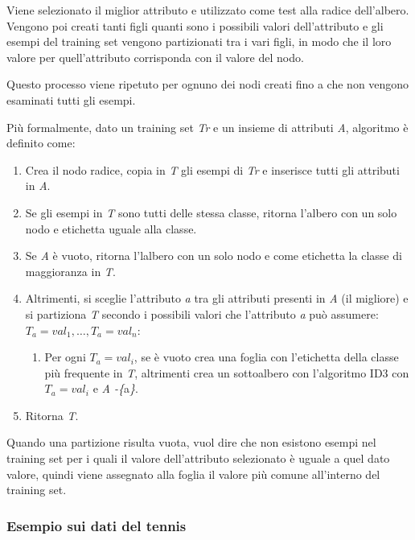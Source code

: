 Viene selezionato il miglior attributo e utilizzato come test alla
radice dell'albero. Vengono poi creati tanti figli quanti sono i
possibili valori dell'attributo e gli esempi del training set vengono
partizionati tra i vari figli, in modo che il loro valore per
quell'attributo corrisponda con il valore del nodo.

Questo processo viene ripetuto per ognuno dei nodi creati fino a che
non vengono esaminati tutti gli esempi.

Più formalmente, dato un training set \emph{Tr} e un insieme di
attributi \emph{A}, algoritmo è definito come:

\begin{enumerate}
\item
  Crea il nodo radice, copia in \emph{T} gli esempi di \emph{Tr} e
  inserisce tutti gli attributi in \emph{A}.
\item
  Se gli esempi in \emph{T} sono tutti delle stessa classe, ritorna
  l'albero con un solo nodo e etichetta uguale alla classe.
\item
  Se \emph{A} è vuoto, ritorna l'lalbero con un solo nodo e come
  etichetta la classe di maggioranza in \emph{T}.
\item
  Altrimenti, si sceglie l'attributo \emph{a} tra gli attributi presenti
  in \emph{A} (il migliore) e si partiziona \emph{T} secondo i possibili
  valori che l'attributo \emph{a} può assumere: $T_a = val_1, \ldots, T_a = val_n$:
 \begin{enumerate}
  \item
    Per ogni $T_a = val_i$, se è vuoto crea una foglia con
    l'etichetta della classe più frequente in \emph{T}, altrimenti crea un
    sottoalbero con l'algoritmo ID3 con $T_a = val_i$ e \emph{A -\{}a\emph{\}}.
  \end{enumerate}
\item
  Ritorna \emph{T}.
\end{enumerate}

Quando una partizione risulta vuota, vuol dire che non esistono esempi
nel training set per i quali il valore dell'attributo selezionato è
uguale a quel dato valore, quindi viene assegnato alla foglia il valore più comune all'interno del training set.

\subsubsection{Esempio sui dati del tennis}\label{esempio-sui-dati-del-tennis}

